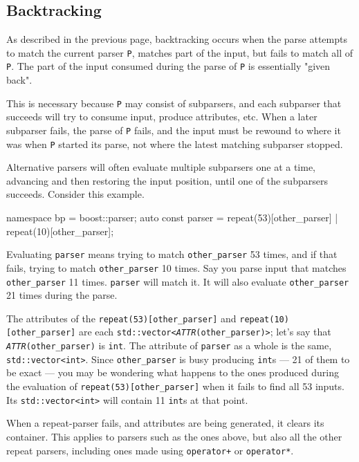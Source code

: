 \subsection{Backtracking}

As described in the previous page, backtracking occurs when the parse attempts to match the current parser \texttt{P}, matches part of the input, but fails to match all of \texttt{P}. The part of the input consumed during the parse of \texttt{P} is essentially "given back".

This is necessary because \texttt{P} may consist of subparsers, and each subparser that succeeds will try to consume input, produce attributes, etc. When a later subparser fails, the parse of \texttt{P} fails, and the input must be rewound to where it was when \texttt{P} started its parse, not where the latest matching subparser stopped.

Alternative parsers will often evaluate multiple subparsers one at a time, advancing and then restoring the input position, until one of the subparsers succeeds. Consider this example.

\begin{code}
namespace bp = boost::parser;
auto const parser = repeat(53)[other_parser] | repeat(10)[other_parser];
\end{code}

Evaluating \texttt{parser} means trying to match \texttt{other\_parser} 53 times, and if that fails, trying to match \texttt{other\_parser} 10 times. Say you parse input that matches \texttt{other\_parser} 11 times. \texttt{parser} will match it. It will also evaluate \texttt{other\_parser} 21 times during the parse.

The attributes of the \texttt{repeat(53){[}other\_parser{]}} and \texttt{repeat(10){[}other\_parser{]}} are each \texttt{std::vector<}\emph{\texttt{ATTR}}\texttt{(other\_parser)>}; let's say that \emph{\texttt{ATTR}}\texttt{(other\_parser)} is \texttt{int}. The attribute of \texttt{parser} as a whole is the same, \texttt{std::vector<int>}. Since \texttt{other\_parser} is busy producing \texttt{int}s --- 21 of them to be exact --- you may be wondering what happens to the ones produced during the evaluation of \texttt{repeat(53){[}other\_parser{]}} when it fails to find all 53 inputs. Its \texttt{std::vector<int>} will contain 11 \texttt{int}s at that point.

When a repeat-parser fails, and attributes are being generated, it clears its container. This applies to parsers such as the ones above, but also all the other repeat parsers, including ones made using \texttt{operator+} or \texttt{operator*}.

